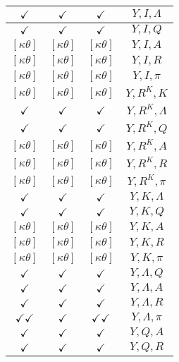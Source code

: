 \documentclass[a4paper,10pt]{article}
\begin{document}
\begin{longtable}{|c|c|c|c|}
\hline
$\checkmark$ & $\checkmark$ & $\checkmark$ & ${Y},{I},{\Lambda}$ \\
\hline
$\checkmark$ & $\checkmark$ & $\checkmark$ & ${Y},{I},{Q}$ \\
\hline
$[\kappa \theta ]$ & $[\kappa \theta ]$ & $[\kappa \theta ]$ & ${Y},{I},{A}$ \\
\hline
$[\kappa \theta ]$ & $[\kappa \theta ]$ & $[\kappa \theta ]$ & ${Y},{I},{R}$ \\
\hline
$[\kappa \theta ]$ & $[\kappa \theta ]$ & $[\kappa \theta ]$ & ${Y},{I},{\pi}$ \\
\hline
$[\kappa \theta ]$ & $[\kappa \theta ]$ & $[\kappa \theta ]$ & ${Y},{R^{K}},{K}$ \\
\hline
$\checkmark$ & $\checkmark$ & $\checkmark$ & ${Y},{R^{K}},{\Lambda}$ \\
\hline
$\checkmark$ & $\checkmark$ & $\checkmark$ & ${Y},{R^{K}},{Q}$ \\
\hline
$[\kappa \theta ]$ & $[\kappa \theta ]$ & $[\kappa \theta ]$ & ${Y},{R^{K}},{A}$ \\
\hline
$[\kappa \theta ]$ & $[\kappa \theta ]$ & $[\kappa \theta ]$ & ${Y},{R^{K}},{R}$ \\
\hline
$[\kappa \theta ]$ & $[\kappa \theta ]$ & $[\kappa \theta ]$ & ${Y},{R^{K}},{\pi}$ \\
\hline
$\checkmark$ & $\checkmark$ & $\checkmark$ & ${Y},{K},{\Lambda}$ \\
\hline
$\checkmark$ & $\checkmark$ & $\checkmark$ & ${Y},{K},{Q}$ \\
\hline
$[\kappa \theta ]$ & $[\kappa \theta ]$ & $[\kappa \theta ]$ & ${Y},{K},{A}$ \\
\hline
$[\kappa \theta ]$ & $[\kappa \theta ]$ & $[\kappa \theta ]$ & ${Y},{K},{R}$ \\
\hline
$[\kappa \theta ]$ & $[\kappa \theta ]$ & $[\kappa \theta ]$ & ${Y},{K},{\pi}$ \\
\hline
$\checkmark$ & $\checkmark$ & $\checkmark$ & ${Y},{\Lambda},{Q}$ \\
\hline
$\checkmark$ & $\checkmark$ & $\checkmark$ & ${Y},{\Lambda},{A}$ \\
\hline
$\checkmark$ & $\checkmark$ & $\checkmark$ & ${Y},{\Lambda},{R}$ \\
\hline
$\checkmark\checkmark$ & $\checkmark$ & $\checkmark\checkmark$ & ${Y},{\Lambda},{\pi}$ \\
\hline
$\checkmark$ & $\checkmark$ & $\checkmark$ & ${Y},{Q},{A}$ \\
\hline
$\checkmark$ & $\checkmark$ & $\checkmark$ & ${Y},{Q},{R}$ \\

\end{longtable}
\end{document}
